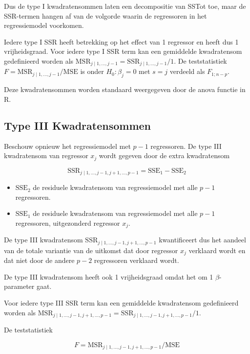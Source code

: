 \documentclass[
  dutch,
  letterpaper,
  12pt]{book}
\providecommand{\tightlist}{%
  \setlength{\itemsep}{0pt}\setlength{\parskip}{0pt}}
\theoremstyle{definition}
\theoremstyle{definition}
\theoremstyle{definition}
\theoremstyle{remark}
\begin{document}
Dus de type I kwadratensommen laten een decompositie van SSTot toe, maar
de SSR-termen hangen af van de volgorde waarin de regressoren in het
regressiemodel voorkomen.

Iedere type I SSR heeft betrekking op het effect van 1 regressor en
heeft dus 1 vrijheidsgraad. Voor iedere type I SSR term kan een
gemiddelde kwadratensom gedefinieerd worden als
\(\text{MSR}_{j\mid 1,\ldots, j-1}=\text{SSR}_{j\mid 1,\ldots, j-1}/1\).
De teststatistiek \(F=\text{MSR}_{j\mid 1,\ldots, j-1}/\text{MSE}\) is
onder \(H_0:\beta_j=0\) met \(s=j\) verdeeld als \(F_{1;n-p}\).

Deze kwadratensommen worden standaard weergegeven door de anova functie
in R.

\subsection{Type III Kwadratensommen}\label{type-iii-kwadratensommen}

Beschouw opnieuw het regressiemodel met \(p-1\) regressoren. De type III
kwadratensom van regressor \(x_j\) wordt gegeven door de extra
kwadratensom

\[
  \text{SSR}_{j \mid 1,\ldots, j-1,j+1,\ldots, p-1} = \text{SSE}_1-\text{SSE}_2
\]

\begin{itemize}
\tightlist
\item
  \(\text{SSE}_2\) de residuele kwadratensom van regressiemodel met alle
  \(p-1\) regressoren.
\item
  \(\text{SSE}_1\) de residuele kwadratensom van regressiemodel met alle
  \(p-1\) regressoren, uitgezonderd regressor \(x_j\).
\end{itemize}

De type III kwadratensom
\(\text{SSR}_{j \mid 1,\ldots, j-1,j+1,\ldots, p-1}\) kwantificeert dus
het aandeel van de totale variantie van de uitkomst dat door regressor
\(x_j\) verklaard wordt en dat niet door de andere \(p-2\) regressoren
verklaard wordt.

De type III kwadratensom heeft ook 1 vrijheidsgraad omdat het om 1
\(\beta\)-parameter gaat.

Voor iedere type III SSR term kan een gemiddelde kwadratensom
gedefinieerd worden als
\(\text{MSR}_{j \mid 1,\ldots, j-1,j+1,\ldots, p-1}=\text{SSR}_{j \mid 1,\ldots, j-1,j+1,\ldots, p-1}/1\).

De teststatistiek

\[
F=\text{MSR}_{j \mid 1,\ldots, j-1,j+1,\ldots, p-1}/\text{MSE}
\]
\end{document}
